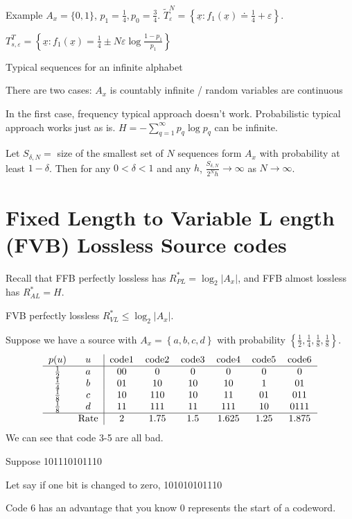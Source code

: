 \documentclass{report}
\newcommand{\set}[1]{\left\lbrace #1 \right\rbrace}
\theoremstyle{definition}
\theoremstyle{remark}
\numberwithin{equation}{section}
\begin{document}
Example $A_x = \{0, 1\}$, $p_1 = \frac{1}{4}, p_0 = \frac{3}{4}$. $\tilde{T}_\varepsilon^N = \set{\underline{x}: f_1(\underline{x}) \doteq \frac{1}{4} + \varepsilon}$.

$T_{s, \varepsilon}^T = \set{\underline{x}: f_1(\underline{x}) = \frac{1}{4} \pm N\varepsilon\log\frac{1 - p_1}{p_1}}$


Typical sequences for an infinite alphabet

There are two cases:
$A_x$ is countably infinite / random variables are continuous

In the first case, frequency typical approach doesn't work. Probabilistic typical approach works just as is. $H = -\sum_{q=1}^\infty p_q \log p_q$ can be infinite.

Let $S_{\delta, N} = $ size of the smallest set of $N$ sequences form $A_x$ with probability at least $1-\delta$. Then for any $0 < \delta < 1$ and any $h$, $\frac{S_{\delta, N}}{2^Nh} \to \infty$ as $N \to \infty$.

\section{Fixed Length to Variable L ength (FVB) Lossless Source codes}

Recall that FFB perfectly lossless has $R^*_{PL} = \log_2|A_x|$, and FFB almost lossless has $R^*_{AL} = H$.

FVB perfectly lossless $R^*_{VL} \leq \log_2|A_x|$.

Suppose we have a source with $A_x = \set{a,b,c,d}$ with probability $\set{\frac{1}{2},\frac{1}{4},\frac{1}{8},\frac{1}{8}}$.
\[\begin{tabular}{cc|cccccc}
  $p(u)$ & $u$ & code1 & code2 & code3 & code4 & code5 & code6\\ \hline
  $\frac{1}{2}$ & $a$ & 00 & 0 & 0 & 0 & 0 & 0 \\ 
  $\frac{1}{4}$ & $b$ & 01 & 10 & 10 & 10 & 1 & 01 \\ 
  $\frac{1}{8}$ & $c$ & 10 & 110 & 10 & 11 & 01 & 011\\
  $\frac{1}{8}$ & $d$ & 11 & 111& 11 & 111 & 10 & 0111\\ \hline
  & Rate & 2 & 1.75 & 1.5 & 1.625 & 1.25 & 1.875
\end{tabular}\]
We can see that code 3-5 are all bad.

Suppose 101110101110

Let say if one bit is changed to zero, 101010101110

Code 6 has an advantage that you know 0 represents the start of a codeword.
\end{document}
